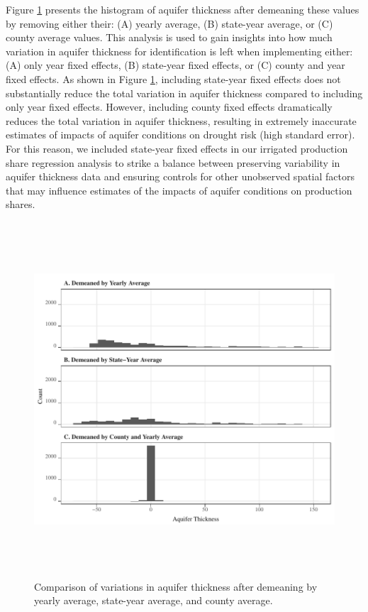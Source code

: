 \documentclass[
]{article}
\begin{document}
Figure \ref{fig:variation-left} presents the histogram of aquifer thickness after demeaning these values by removing either their: (A) yearly average, (B) state-year average, or (C) county average values. This analysis is used to gain insights into how much variation in aquifer thickness for identification is left when implementing either: (A) only year fixed effects, (B) state-year fixed effects, or (C) county and year fixed effects. As shown in Figure \ref{fig:variation-left}, including state-year fixed effects does not substantially reduce the total variation in aquifer thickness compared to including only year fixed effects. However, including county fixed effects dramatically reduces the total variation in aquifer thickness, resulting in extremely inaccurate estimates of impacts of aquifer conditions on drought risk (high standard error). For this reason, we included state-year fixed effects in our irrigated production share regression analysis to strike a balance between preserving variability in aquifer thickness data and ensuring controls for other unobserved spatial factors that may influence estimates of the impacts of aquifer conditions on production shares. 

\begin{figure}[H]

{\centering \includegraphics[width=6in,height=500px,]{../../Figures/g_variation} 

}

\caption{Comparison of variations in aquifer thickness after demeaning by yearly average, state-year average, and county average.}\label{fig:variation-left}
\end{figure}
\end{document}
